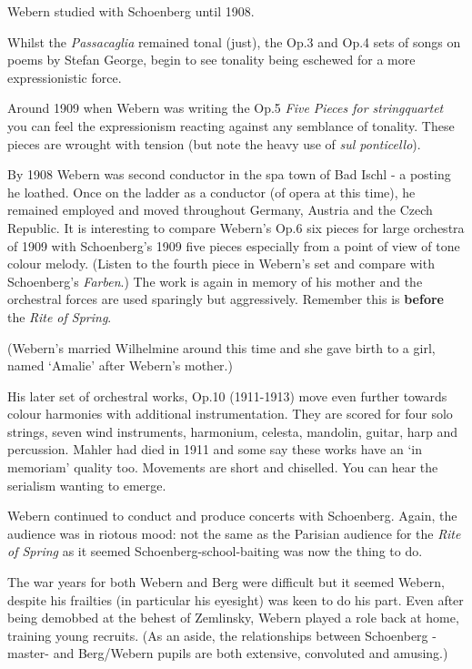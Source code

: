 Webern studied with Schoenberg until 1908.

Whilst the \textit{Passacaglia} remained tonal (just), the Op.3 and Op.4 sets of songs on poems by Stefan George, begin to see tonality being eschewed for a more expressionistic force. 

Around 1909 when Webern was writing the Op.5 \textit{Five Pieces for stringquartet} you can feel the expressionism reacting against any semblance of tonality. These pieces are wrought with tension (but note the heavy use of \textit{sul ponticello}). 

By 1908 Webern was second conductor in the spa town of Bad Ischl - a posting he loathed. Once on the ladder as a conductor (of opera at this time), he remained employed and moved throughout Germany, Austria and the Czech Republic. It is interesting to compare Webern's Op.6 six pieces for large orchestra of 1909 with Schoenberg's 1909 five pieces especially from a point of view of tone colour melody. (Listen to the fourth piece in Webern's set and compare with Schoenberg's \textit{Farben}.) The work is again in memory of his mother and the orchestral forces are used sparingly but aggressively. Remember this is \textbf{before} the \textit{Rite of Spring}.

(Webern's married Wilhelmine around this time and she gave birth to a girl, named `Amalie' after Webern's mother.)

His later set of orchestral works, Op.10 (1911-1913) move even further towards colour harmonies with additional instrumentation. They are scored for four solo strings, seven wind instruments, harmonium, celesta, mandolin, guitar, harp and percussion. Mahler had died in 1911 and some say these works have an `in memoriam' quality too. Movements are short and chiselled. You can hear the serialism wanting to emerge. 

Webern continued to conduct and produce concerts with Schoenberg. Again, the audience was in riotous mood: not the same as the Parisian audience for the \textit{Rite of Spring} as it seemed Schoenberg-school-baiting was now the thing to do. 

The war years for both Webern and Berg were difficult but it seemed Webern, despite his frailties (in particular his eyesight) was keen to do his part. Even after being demobbed at the behest of Zemlinsky, Webern played a role back at home, training young recruits. (As an aside, the relationships between Schoenberg - master- and Berg/Webern pupils are both extensive, convoluted and amusing.)


